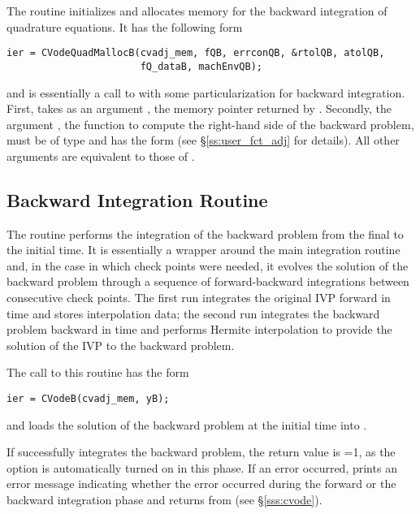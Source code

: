 The routine  initializes and allocates memory for the backward
integration of quadrature equations. It has the following form
\begin{verbatim}
ier = CVodeQuadMallocB(cvadj_mem, fQB, errconQB, &rtolQB, atolQB, 
                       fQ_dataB, machEnvQB);
\end{verbatim}
and is essentially a call to  with some particularization for 
backward integration. First,  takes as an argument 
, the memory pointer returned by .
Secondly, the argument , the {\C} function to compute the right-hand side 
of the backward problem, must be of type  and
has the form  
(see \S\ref{ss:user_fct_adj} for details). 
All other arguments are equivalent to those of . 

\subsection{Backward Integration Routine}\label{sss:cvodeb}

The routine  performs the integration of the backward problem
from the final to the initial time. It is essentially a wrapper
around the {\cvodes} main integration routine  and, in the case
in which check points were needed, it evolves the solution of the backward 
problem through a sequence of forward-backward integrations between consecutive
check points. The first run integrates the original IVP forward in time and
stores interpolation data; the second run integrates the backward problem 
backward in time and performs Hermite interpolation to provide
the solution of the IVP to the backward problem.

The call to this routine has the form
\begin{verbatim}
ier = CVodeB(cvadj_mem, yB);
\end{verbatim}
and loads the solution of the backward problem at the initial time into
. 

If  successfully integrates the backward problem, the return value
is =1, as the  option is automatically turned on in this
phase. If an error occurred,  prints an error message indicating whether 
the error occurred during the forward or the backward integration phase and returns 
 from  (see \S\ref{sss:cvode}).


